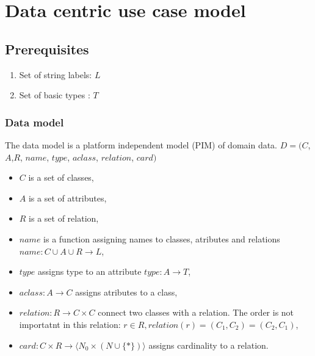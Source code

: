 \documentclass[10pt,a4paper]{article}
\begin{document}
\section{Data centric use case model}

\subsection{Prerequisites} 
\begin{enumerate}
	\item Set of string labels: $L$ 
	\item Set of basic types : $T$ 
	
\end{enumerate}
\subsubsection{Data model}
The data model is a platform independent model (PIM) of domain data.
$D = ( C$,$ A$,$ R$, $name$, $type$, $aclass$, $relation$, $card)$
\begin{itemize}
	\item $C$ is a set of classes,
	\item $A$ is a set of attributes,
	\item $R$ is a set of relation,
	\item $name$ is a function assigning names to classes, atributes and relations $name: C \cup A \cup R \rightarrow L$,
	\item $type$ assigns type to an attribute $type: A \rightarrow T$,
	\item $aclass: A \rightarrow C$ assigns atributes to a class,
	\item $relation: R \rightarrow C \times C$ connect two classes with a relation. The order is not importatnt in this relation: $r \in R, relation(r)=(C_1, C_2)=(C_2, C_1)$,
	\item $card: C \times R \rightarrow \langle N_0 \times (N \cup \lbrace * \rbrace) \rangle$ assigns cardinality to a relation.
\end{itemize}
\end{document}
